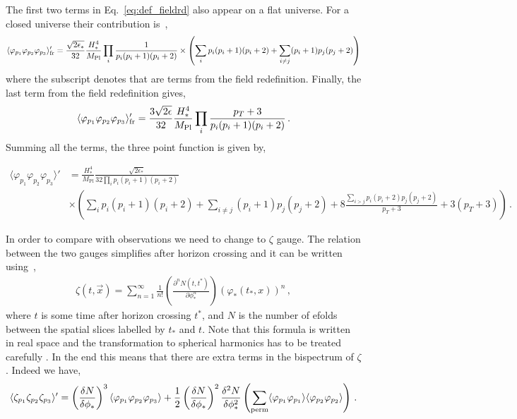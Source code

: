 \documentclass[a4paper,11pt]{article}
\numberwithin{equation}{section}
\newcommand{\mpl}{{M_{\mathrm{Pl}}}}
\def\x{{\vec{x}}}
\numberwithin{equation}{section}
\begin{document}
The first two terms in Eq.~\eqref{eq:def_fieldrd} also appear on a flat universe. For a closed universe their contribution is~\cite{Clunan:2009ib},
\begin{align}
\label{eq:3pfFR12}
\langle  \varphi_{p_1}\varphi_{p_2}\varphi_{p_3}\rangle_{\rm{fr}}'=\frac{\sqrt{2\epsilon_*}}{32}\frac{H_*^4}{\mpl}\prod_{i}\frac{1}{p_i(p_i+1)(p_i+2)}\times\left(\sum_i p_i(p_i+1)(p_i+2)+\sum_{i\neq j}(p_i+1)p_j(p_j+2)\right)
\end{align}
where  the subscript denotes that are terms from the field redefinition.
Finally, the last term from the field redefinition gives,
\begin{align}
\label{eq:3pfFR13}
\langle \varphi_{p_1}\varphi_{p_2}\varphi_{p_3}\rangle_{\rm{fr}}'=\frac{3\sqrt{2\epsilon}}{32}\frac{H_*^4}{\mpl}\prod_{i}\frac{p_T+3}{p_i(p_i+1)(p_i+2)} \,.
\end{align}
Summing all the terms, the three point function is given by,
\begin{small}
\begin{align}
\langle \varphi_{p_1}\varphi_{p_2}\varphi_{p_3}\rangle'&=\frac{H_*^4}{\mpl}\frac{\sqrt{2\epsilon_*}}{32\prod_{i}p_i(p_i+1)(p_i+2)}\\
&\times\left(\sum_i p_i(p_i+1)(p_i+2)+\sum_{i\neq j}(p_i+1)p_j(p_j+2)+8\frac{\sum_{i>j}p_i(p_i+2)p_j(p_j+2)}{p_T+3}+3(p_T+3)\right) \,. \nonumber
\end{align}
\end{small}
In order to compare with observations we  need to change to  $\zeta$ gauge. The relation between the two gauges simplifies after horizon crossing and it can be written using~\cite{Sasaki:1995aw},
\begin{align}
\zeta (t,\x)= \sum_{n=1}^{\infty}\frac{1}{n!}\left(\frac{\partial ^nN(t,t^*)}{\partial\phi_*^n}\right)(\varphi_*(t_*,x))^n \,,
\end{align}
where $t$ is some time after horizon crossing $t^*$,  and  $N$ is the number of efolds between the spatial slices labelled by $t_*$ and $t$. Note that this formula is written in real space and the transformation to spherical harmonics  has to be treated carefully \cite{Clunan:2009ib}.  In the end this means that there  are extra terms in the  bispectrum of $\zeta$. Indeed we have,
\begin{align}
\langle \zeta_{p_1}\zeta_{p_2}\zeta_{p_3}\rangle'=\left(\frac{\delta N}{\delta\phi_*}\right)^3\langle\varphi_{p_1}\varphi_{p_2}\varphi_{p_3}\rangle+\frac{1}{2}\left(\frac{\delta N}{\delta\phi_*}\right)^2 \frac{\delta^2 N}{\delta \phi_*^2}\left(\sum_{\rm{perm}}\langle \varphi_{p_1}\varphi_{p_1}\rangle\langle \varphi_{p_2}\varphi_{p_2}\rangle\right) \,.
\label{eq:3pfZetaCoV}
\end{align}
\end{document}
